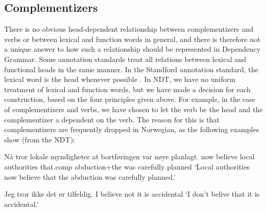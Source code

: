 \documentclass[10pt,a4paper]{article}
\begin{document}
\subsection{Complementizers}
There is no obvious head-dependent relationship between complementizers and verbs or between lexical and function words in general, and there is therefore not a unique answer to how such a relationship should be represented in Dependency Grammar.
Some annotation standards treat all relations between lexical and functional heads in the same manner. In the Standford annotation standard, the lexical word is the head whenever possible \cite[2]{Mar:Man:08}.
In NDT, we have no uniform treatment of lexical and function words, but we have made a decision for each construction, based on the four principles given above. For example, in the case of complementizers and verbs, we have chosen to let the verb be the head and the complementizer a dependent on the verb. The reason for this is that
complementizers are frequently dropped in Norwegian, as the following examples show (from the NDT):
\begin{examples}
\item\label{ex:medat}
\gll Nå tror lokale myndigheter at bortføringen var nøye planlagt.
now believe local authorities that.comp abduction+the was carefully planned
\glt `Local authorities now believe that the abduction was carefully planned.'
\glend

\item\label{ex:utenat}
\gll Jeg tror ikke det er tilfeldig.
I believe not it is accidental
\glt `I don't belive that it is accidental.'
\glend
\end{examples}
\end{document}
